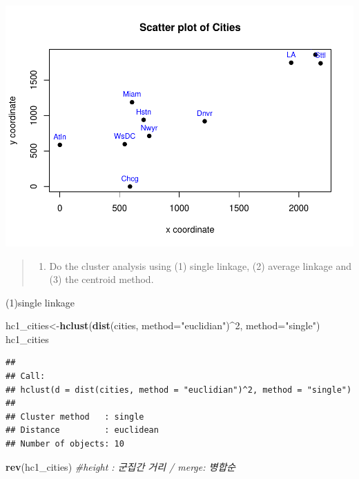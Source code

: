 \documentclass[]{article}
\newenvironment{Shaded}{\begin{snugshade}}{\end{snugshade}}
\newcommand{\KeywordTok}[1]{\textcolor[rgb]{0.13,0.29,0.53}{\textbf{{#1}}}}
\newcommand{\DataTypeTok}[1]{\textcolor[rgb]{0.13,0.29,0.53}{{#1}}}
\newcommand{\DecValTok}[1]{\textcolor[rgb]{0.00,0.00,0.81}{{#1}}}
\newcommand{\StringTok}[1]{\textcolor[rgb]{0.31,0.60,0.02}{{#1}}}
\newcommand{\CommentTok}[1]{\textcolor[rgb]{0.56,0.35,0.01}{\textit{{#1}}}}
\newcommand{\NormalTok}[1]{{#1}}
\providecommand{\tightlist}{%
  \setlength{\itemsep}{0pt}\setlength{\parskip}{0pt}}
\begin{document}
\includegraphics{hw7_files/figure-latex/unnamed-chunk-3-1.pdf}

\begin{quote}
\begin{enumerate}
\def\labelenumi{\arabic{enumi})}
\tightlist
\item
  Do the cluster analysis using (1) single linkage, (2) average linkage
  and (3) the centroid method.
\end{enumerate}
\end{quote}

(1)single linkage

\begin{Shaded}
\begin{Highlighting}[]
\NormalTok{hc1_cities<-}\KeywordTok{hclust}\NormalTok{(}\KeywordTok{dist}\NormalTok{(cities, }\DataTypeTok{method=}\StringTok{"euclidian"}\NormalTok{)^}\DecValTok{2}\NormalTok{, }\DataTypeTok{method=}\StringTok{"single"}\NormalTok{)}
\NormalTok{hc1_cities}
\end{Highlighting}
\end{Shaded}

\begin{verbatim}
## 
## Call:
## hclust(d = dist(cities, method = "euclidian")^2, method = "single")
## 
## Cluster method   : single 
## Distance         : euclidean 
## Number of objects: 10
\end{verbatim}

\begin{Shaded}
\begin{Highlighting}[]
\KeywordTok{rev}\NormalTok{(hc1_cities) }\CommentTok{#height : 군집간 거리 / merge: 병합순}
\end{Highlighting}
\end{Shaded}
\end{document}
